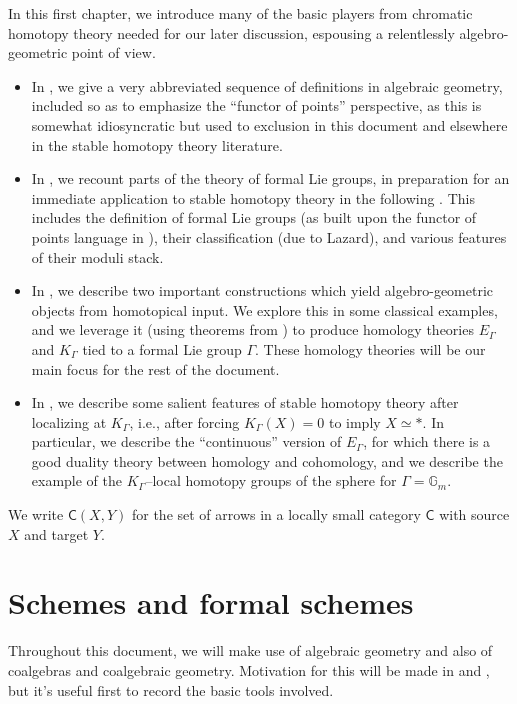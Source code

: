 \documentclass{amsart}
\newcommand{\G}{\mathbb G}
\newcommand{\<}{\langle}
\renewcommand{\>}{\rangle}
\newcommand{\CatOf}[1]{\mathsf{#1}}
\theoremstyle{plain}
\theoremstyle{definition}
\theoremstyle{remark}
\begin{document}
In this first chapter, we introduce many of the basic players from chromatic homotopy theory needed for our later discussion, espousing a relentlessly algebro-geometric point of view.
\begin{itemize}
\item In , we give a very abbreviated sequence of definitions in algebraic geometry, included so as to emphasize the ``functor of points'' perspective, as this is somewhat idiosyncratic but used to exclusion in this document and elsewhere in the stable homotopy theory literature.
\item In , we recount parts of the theory of formal Lie groups, in preparation for an immediate application to stable homotopy theory in the following .  This includes the definition of formal Lie groups (as built upon the functor of points language in ), their classification (due to Lazard), and various features of their moduli stack.
\item In , we describe two important constructions which yield algebro-geometric objects from homotopical input.  We explore this in some classical examples, and we leverage it (using theorems from ) to produce homology theories $E_\Gamma$ and $K_\Gamma$ tied to a formal Lie group $\Gamma$.  These homology theories will be our main focus for the rest of the document.
\item In , we describe some salient features of stable homotopy theory after localizing at $K_\Gamma$, i.e., after forcing $K_\Gamma(X) = 0$ to imply $X \simeq *$.  In particular, we describe the ``continuous'' version of $E_\Gamma$, for which there is a good duality theory between homology and cohomology, and we describe the example of the $K_\Gamma$--local homotopy groups of the sphere for $\Gamma = \G_m$.
\end{itemize}

\noindent We write $\CatOf{C}(X, Y)$ for the set of arrows in a locally small category $\CatOf{C}$ with source $X$ and target $Y$.

\section{Schemes and formal schemes}\label{SchemesAndFormalSchemes}

Throughout this document, we will make use of algebraic geometry and also of coalgebras and coalgebraic geometry.  Motivation for this will be made in  and , but it's useful first to record the basic tools involved.
\end{document}
